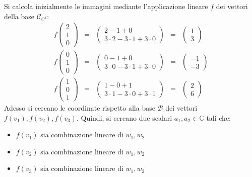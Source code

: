 \documentclass[a4paper]{article}
\begin{document}
	Si calcola inizialmente le immagini mediante l'applicazione lineare $f$ dei vettori della base $\mathscr{C}_{\mathbb{C}^{3}}$:
	\begin{equation*}
		\begin{array}{lllll}
			f\begin{pmatrix}
				2 \\ 1 \\ 0
			\end{pmatrix} &=& \begin{pmatrix}
				2 - 1 + 0 \\
				3 \cdot 2 - 3 \cdot 1 + 3 \cdot 0
			\end{pmatrix} &=& \begin{pmatrix}
				1 \\
				3
			\end{pmatrix} \\ [1.8em]
			f\begin{pmatrix}
				0 \\ 1 \\ 0
			\end{pmatrix} &=& \begin{pmatrix}
				0 - 1 + 0 \\
				3 \cdot 0 - 3 \cdot 1 + 3 \cdot 0
			\end{pmatrix} &=& \begin{pmatrix}
				-1 \\
				-3
			\end{pmatrix} \\ [1.8em]
			f\begin{pmatrix}
				1 \\ 0 \\ 1
			\end{pmatrix} &=& \begin{pmatrix}
				1 - 0 + 1 \\
				3 \cdot 1 - 3 \cdot 0 + 3 \cdot 1
			\end{pmatrix} &=& \begin{pmatrix}
				2 \\
				6
			\end{pmatrix}
		\end{array}
	\end{equation*}
	Adesso si cercano le coordinate rispetto alla base $\mathscr{B}$ dei vettori $f\left(v_{1}\right), f\left(v_{2}\right), f\left(v_{3}\right)$. Quindi, si cercano due scalari $a_{1}, a_{2} \in \mathbb{C}$ tali che:
	\begin{itemize}
		\item $f\left(v_{1}\right)$ sia combinazione lineare di $w_{1}, w_{2}$
		
		\item $f\left(v_{2}\right)$ sia combinazione lineare di $w_{1}, w_{2}$
		
		\item $f\left(v_{3}\right)$ sia combinazione lineare di $w_{1}, w_{2}$
	\end{itemize}\newpage
	
\end{document}
